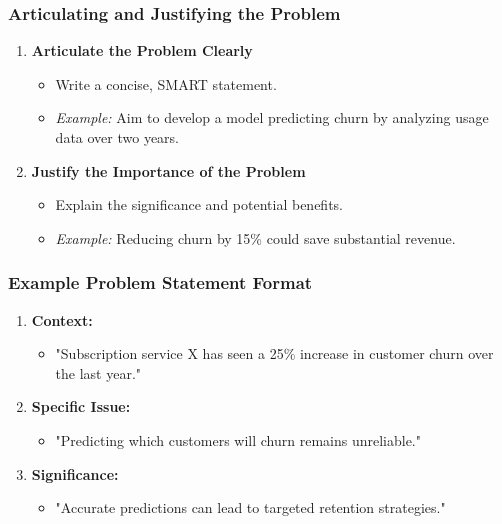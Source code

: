 \documentclass[aspectratio=169]{beamer}
\begin{document}
\begin{frame}[fragile]
    \frametitle{Articulating and Justifying the Problem}
    \begin{enumerate}[resume]
        \item \textbf{Articulate the Problem Clearly}
            \begin{itemize}
                \item Write a concise, SMART statement.
                \item \textit{Example:} Aim to develop a model predicting churn by analyzing usage data over two years.
            \end{itemize}
        \item \textbf{Justify the Importance of the Problem}
            \begin{itemize}
                \item Explain the significance and potential benefits.
                \item \textit{Example:} Reducing churn by 15\% could save substantial revenue.
            \end{itemize}
    \end{enumerate}
\end{frame}

\begin{frame}[fragile]
    \frametitle{Example Problem Statement Format}
    \begin{enumerate}
        \item \textbf{Context:}
            \begin{itemize}
                \item "Subscription service X has seen a 25\% increase in customer churn over the last year."
            \end{itemize}
        \item \textbf{Specific Issue:}
            \begin{itemize}
                \item "Predicting which customers will churn remains unreliable."
            \end{itemize}
        \item \textbf{Significance:}
            \begin{itemize}
                \item "Accurate predictions can lead to targeted retention strategies."
            \end{itemize}
    \end{enumerate}
\end{frame}
\end{document}

